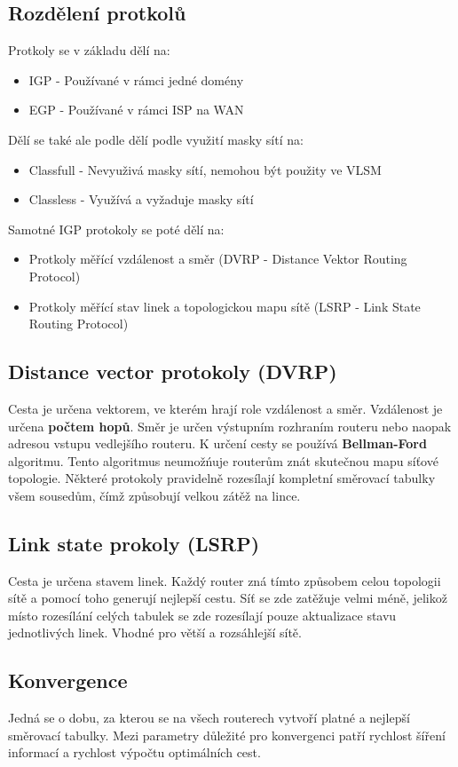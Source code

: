 \subsection{Rozdělení protkolů}
Protkoly se v základu dělí na:
\begin{itemize}
    \item IGP - Používané v rámci jedné domény
    \item EGP - Používané v rámci ISP na WAN
\end{itemize}
Dělí se také ale podle dělí podle využití masky sítí na:
\begin{itemize}
    \item Classfull - Nevyuživá masky sítí, nemohou být použity ve VLSM
    \item Classless - Využívá a vyžaduje masky sítí
\end{itemize}
Samotné IGP protokoly se poté dělí na:
\begin{itemize}
    \item Protkoly měřící vzdálenost a směr (DVRP - Distance Vektor Routing Protocol)
    \item Protkoly měřící stav linek a topologickou mapu sítě (LSRP - Link State Routing Protocol)
\end{itemize}
\subsection{Distance vector protokoly (DVRP)}
Cesta je určena vektorem, ve kterém hrají role vzdálenost a směr.
Vzdálenost je určena \textbf{počtem hopů}.
Směr je určen výstupním rozhraním routeru nebo naopak adresou vstupu vedlejšího routeru.
K určení cesty se používá \textbf{Bellman-Ford} algoritmu.
Tento algoritmus neumožńuje routerům znát skutečnou mapu síťové topologie.
Některé protokoly pravidelně rozesílají kompletní směrovací tabulky všem sousedům, čímž způsobují velkou zátěž na lince.
\subsection{Link state prokoly (LSRP)}
Cesta je určena stavem linek.
Každý router zná tímto způsobem celou topologii sítě a pomocí toho generují nejlepší cestu.
Síť se zde zatěžuje velmi méně, jelikož místo rozesílání celých tabulek se zde rozesílají pouze aktualizace stavu jednotlivých linek.
Vhodné pro větší a rozsáhlejší sítě.
\subsection{Konvergence}
Jedná se o dobu, za kterou se na všech routerech vytvoří platné a nejlepší směrovací tabulky.
Mezi parametry důležité pro konvergenci patří rychlost šíření informací a rychlost výpočtu optimálních cest.
